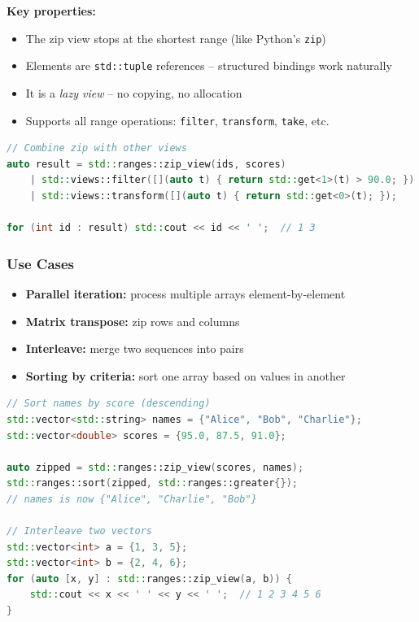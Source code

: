 \textbf{Key properties:}
\begin{itemize}
\item The zip view stops at the shortest range (like Python's \texttt{zip})
\item Elements are \texttt{std::tuple} references -- structured bindings work naturally
\item It is a \emph{lazy view} -- no copying, no allocation
\item Supports all range operations: \texttt{filter}, \texttt{transform}, \texttt{take}, etc.
\end{itemize}

\begin{lstlisting}[language=C++]
// Combine zip with other views
auto result = std::ranges::zip_view(ids, scores)
    | std::views::filter([](auto t) { return std::get<1>(t) > 90.0; })
    | std::views::transform([](auto t) { return std::get<0>(t); });

for (int id : result) std::cout << id << ' ';  // 1 3
\end{lstlisting}

\subsubsection{Use Cases}

\begin{itemize}
\item \textbf{Parallel iteration:} process multiple arrays element-by-element
\item \textbf{Matrix transpose:} zip rows and columns
\item \textbf{Interleave:} merge two sequences into pairs
\item \textbf{Sorting by criteria:} sort one array based on values in another
\end{itemize}

\begin{lstlisting}[language=C++]
// Sort names by score (descending)
std::vector<std::string> names = {"Alice", "Bob", "Charlie"};
std::vector<double> scores = {95.0, 87.5, 91.0};

auto zipped = std::ranges::zip_view(scores, names);
std::ranges::sort(zipped, std::ranges::greater{});
// names is now {"Alice", "Charlie", "Bob"}

// Interleave two vectors
std::vector<int> a = {1, 3, 5};
std::vector<int> b = {2, 4, 6};
for (auto [x, y] : std::ranges::zip_view(a, b)) {
    std::cout << x << ' ' << y << ' ';  // 1 2 3 4 5 6
}
\end{lstlisting}

